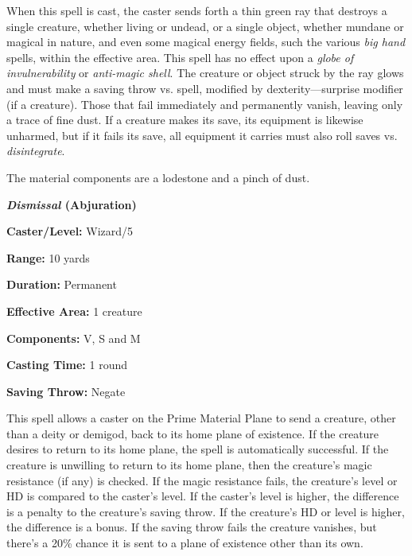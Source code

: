 \begin{multicols}{2}
When this spell is cast, the caster sends forth a thin green ray that destroys a single creature, whether living or undead, or a single object, whether mundane or magical in nature, and even some magical energy fields, such the various \textit{big hand} spells, within the effective area.  This spell has no effect upon a \textit{globe of invulnerability} or \textit{anti-magic shell}.  The creature or object struck by the ray glows and must make a saving throw vs. spell, modified by dexterity---surprise modifier (if a creature).  Those that fail immediately and permanently vanish, leaving only a trace of fine dust.  If a creature makes its save, its equipment is likewise unharmed, but if it fails its save, all equipment it carries must also roll saves vs. \textit{disintegrate}.

The material components are a lodestone and a pinch of dust.

\vspace{1em}

\noindent
\begin{minipage}{\columnwidth}

\noindent \textbf{\textit{Dismissal} (Abjuration)}

\noindent \textbf{Caster/Level:} Wizard/5

\noindent \textbf{Range:} 10 yards

\noindent \textbf{Duration:} Permanent

\noindent \textbf{Effective Area:} 1 creature

\noindent \textbf{Components:} V, S and M

\noindent \textbf{Casting Time:} 1 round

\noindent \textbf{Saving Throw:} Negate

\end{minipage}

This spell allows a caster on the Prime Material Plane to send a creature, other than a deity or demigod, back to its home plane of existence.  If the creature desires to return to its home plane, the spell is automatically successful.  If the creature is unwilling to return to its home plane, then the creature's magic resistance (if any) is checked.  If the magic resistance fails, the creature's level or HD is compared to the caster's level.  If the caster's level is higher, the difference is a penalty to the creature's saving throw.  If the creature's HD or level is higher, the difference is a bonus.  If the saving throw fails the creature vanishes, but there's a 20\% chance it is sent to a plane of existence other than its own.


\end{multicols}
